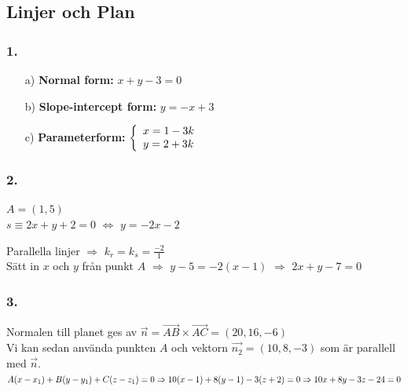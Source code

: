\documentclass{article}
\begin{document}
\subsection*{Linjer och Plan}
\subsubsection*{1.}
\begin{itemize}
\item[a) ]
{\bf Normal form: }
$x+y-3=0$
\item[b) ]
{\bf Slope-intercept form: }
$y=-x+3$
\item[c)]
{\bf Parameterform: }
$\left\{
\begin{array}{l l}
    x=1-3k\\
    y=2+3k
\end{array}\right.$
\end{itemize}

\noindent
\subsubsection*{2.}
$A=(1,5)$\\
$s \equiv 2x+y+2=0$ $\Leftrightarrow$ $y=-2x-2$

\noindent
Parallella linjer $\Rightarrow$ $k_{r} = k_{s} = \frac{-2}{1}$\\
Sätt in $x$ och $y$ från punkt $A$ $\Rightarrow$ $y-5 = -2(x-1)$ $\Rightarrow$ 
$2x+y-7=0$\\


\noindent
\subsubsection*{3.}
Normalen till planet ges av $\overrightarrow{n}=\overrightarrow{AB} \times 
\overrightarrow{AC} = (20,16,-6)$\\
Vi kan sedan använda punkten $A$ och vektorn $\overrightarrow{n_{2}}=
(10,8,-3)$ som är parallell med $\overrightarrow{n}$.\\
$A(x-x_{1})+B(y-y_{1})+C(z-z_{1})=0 \Rightarrow \\
10(x-1)+8(y-1)-3(z+2)=0 \Rightarrow \\
10x+8y-3z-24=0$
\end{document}
